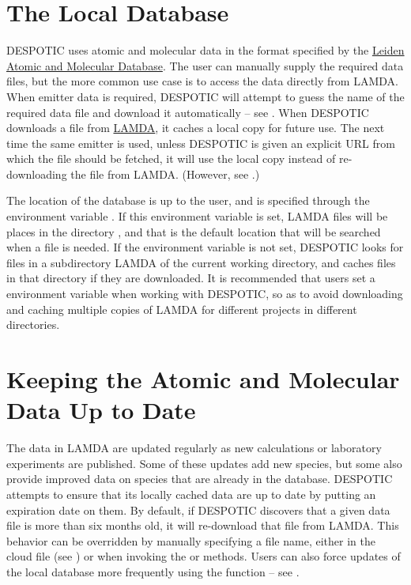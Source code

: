 \documentclass[letterpaper,10pt,english]{sphinxmanual}
\begin{document}
\section{The Local Database}
\label{data:the-local-database}
DESPOTIC uses atomic and molecular data in the format specified by the
\href{http://home.strw.leidenuniv.nl/~moldata/}{Leiden Atomic and Molecular Database}. The user can manually
supply the required data files, but the more common use case is to
access the data directly from LAMDA. When emitter data is required,
DESPOTIC will attempt to guess the name of the required data file and
download it automatically -- see {\hyperref[cloudfiles:ssec-emitters]{\emph{}}}. When DESPOTIC
downloads a file from \href{http://home.strw.leidenuniv.nl/~moldata/}{LAMDA}, it caches a local copy
for future use. The next time the same emitter is used, unless
DESPOTIC is given an explicit URL from which the file should be
fetched, it will use the local copy instead of re-downloading the file
from LAMDA. (However, see {\hyperref[data:ssec-database-updates]{\emph{}}}.)

The location of the database is up to the user, and is specified
through the environment variable . If this
environment variable is set, LAMDA files will be places in the
directory , and that is the default location
that will be searched when a file is needed. If the environment
variable  is not set, DESPOTIC looks for files in a
subdirectory LAMDA of the current working directory, and caches files
in that directory if they are downloaded. It is recommended that users
set a  environment variable when working with
DESPOTIC, so as to avoid downloading and caching multiple copies of
LAMDA for different projects in different directories.


\section{Keeping the Atomic and Molecular Data Up to Date}
\label{data:keeping-the-atomic-and-molecular-data-up-to-date}\label{data:ssec-database-updates}
The data in LAMDA are updated regularly as new calculations or
laboratory experiments are published. Some of these updates add new
species, but some also provide improved data on species that are
already in the database. DESPOTIC attempts to ensure that its locally
cached data are up to date by putting an expiration date on them. By
default, if DESPOTIC discovers that a given data file is more than six
months old, it will re-download that file from LAMDA. This behavior
can be overridden by manually specifying a file name, either in the
cloud file (see {\hyperref[cloudfiles:sec-cloudfiles]{\emph{}}}) or when invoking
the  or  methods. Users
can also force updates of the local database more frequently using the
 function -- see {\hyperref[fulldoc:sssec-full-refreshlamda]{\emph{}}}.
\end{document}
